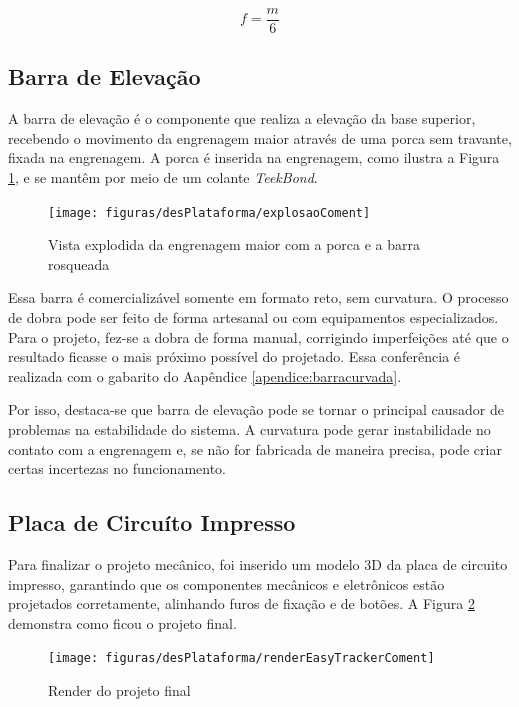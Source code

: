 \begin{equation}
	f = \dfrac{m}{6}
	\label{eq:f}
\end{equation}


\subsection{Barra de Elevação}

A barra de elevação é o componente que realiza a elevação da base superior, recebendo o movimento da engrenagem maior através de uma porca sem travante, fixada na engrenagem. A porca é inserida na engrenagem, como ilustra a Figura \ref{fig:explosao}, e se mantêm por meio de um colante \textit{TeekBond}. 

\begin{figure}[htb]
	\centering
	\caption{Vista explodida da engrenagem maior com a porca e a barra rosqueada}
	\texttt{[image: figuras/desPlataforma/explosaoComent]}
	\label{fig:explosao}
\end{figure}

Essa barra é comercializável somente em formato reto, sem curvatura. O processo de dobra pode ser feito de forma artesanal ou com equipamentos especializados. Para o projeto, fez-se a dobra de forma manual, corrigindo imperfeições até que o resultado ficasse o mais próximo possível do projetado. Essa conferência é realizada com o gabarito do Aapêndice \ref{apendice:barracurvada}. 


Por isso, destaca-se que barra de elevação pode se tornar o principal causador de problemas na estabilidade do sistema. A curvatura pode gerar instabilidade no contato com a engrenagem e, se não for fabricada de maneira precisa, pode criar certas incertezas no funcionamento. 

\subsection{Placa de Circuíto Impresso}
Para finalizar o projeto mecânico, foi inserido um modelo 3D da placa de circuito impresso, garantindo que os componentes mecânicos e eletrônicos estão projetados corretamente, alinhando furos de fixação e de botões. A Figura \ref{fig:renderEasyTracker} demonstra como ficou o projeto final.

\begin{figure}[!htb]
	\centering
	\caption{Render do projeto final}
	\texttt{[image: figuras/desPlataforma/renderEasyTrackerComent]}
	\label{fig:renderEasyTracker}
\end{figure}


